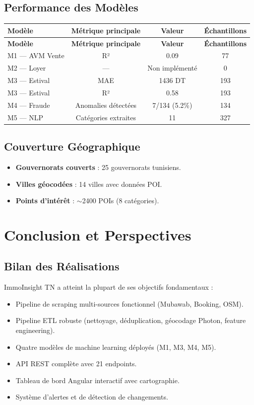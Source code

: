 \documentclass[12pt,a4paper]{report}
\begin{document}
\section{Performance des Modèles}

\begin{longtable}{lccc}
\toprule
\textbf{Modèle} & \textbf{Métrique principale} & \textbf{Valeur} & \textbf{Échantillons} \\
\midrule
\endfirsthead
\toprule
\textbf{Modèle} & \textbf{Métrique principale} & \textbf{Valeur} & \textbf{Échantillons} \\
\midrule
\endhead
\bottomrule
\endfoot
M1 — AVM Vente & R² & 0.09 & 77 \\
M2 — Loyer & — & Non implémenté & 0 \\
M3 — Estival & MAE & 1436 DT & 193 \\
M3 — Estival & R² & 0.58 & 193 \\
M4 — Fraude & Anomalies détectées & 7/134 (5.2\%) & 134 \\
M5 — NLP & Catégories extraites & 11 & 327 \\
\bottomrule
\end{longtable}

\section{Couverture Géographique}

\begin{itemize}
    \item \textbf{Gouvernorats couverts} : 25 gouvernorats tunisiens.
    \item \textbf{Villes géocodées} : 14 villes avec données POI.
    \item \textbf{Points d'intérêt} : $\sim$2400 POIs (8 catégories).
\end{itemize}

\chapter{Conclusion et Perspectives}

\section{Bilan des Réalisations}

ImmoInsight TN a atteint la plupart de ses objectifs fondamentaux :
\begin{itemize}
    \item Pipeline de scraping multi-sources fonctionnel (Mubawab, Booking, OSM).
    \item Pipeline ETL robuste (nettoyage, déduplication, géocodage Photon, feature engineering).
    \item Quatre modèles de machine learning déployés (M1, M3, M4, M5).
    \item API REST complète avec 21 endpoints.
    \item Tableau de bord Angular interactif avec cartographie.
    \item Système d'alertes et de détection de changements.
\end{itemize}
\end{document}
